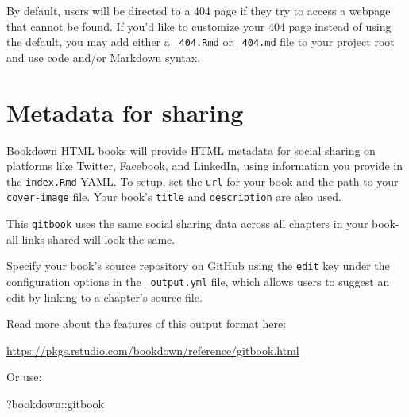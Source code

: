 \documentclass[
]{book}
\newenvironment{Shaded}{\begin{snugshade}}{\end{snugshade}}
\newcommand{\NormalTok}[1]{#1}
\newcommand{\SpecialCharTok}[1]{\textcolor[rgb]{0.00,0.00,0.00}{#1}}
\theoremstyle{definition}
\theoremstyle{definition}
\theoremstyle{definition}
\theoremstyle{definition}
\theoremstyle{remark}
\begin{document}
By default, users will be directed to a 404 page if they try to access a webpage that cannot be found. If you'd like to customize your 404 page instead of using the default, you may add either a \texttt{\_404.Rmd} or \texttt{\_404.md} file to your project root and use code and/or Markdown syntax.

\hypertarget{metadata-for-sharing}{%
\section{Metadata for sharing}\label{metadata-for-sharing}}

Bookdown HTML books will provide HTML metadata for social sharing on platforms like Twitter, Facebook, and LinkedIn, using information you provide in the \texttt{index.Rmd} YAML. To setup, set the \texttt{url} for your book and the path to your \texttt{cover-image} file. Your book's \texttt{title} and \texttt{description} are also used.

This \texttt{gitbook} uses the same social sharing data across all chapters in your book- all links shared will look the same.

Specify your book's source repository on GitHub using the \texttt{edit} key under the configuration options in the \texttt{\_output.yml} file, which allows users to suggest an edit by linking to a chapter's source file.

Read more about the features of this output format here:

\url{https://pkgs.rstudio.com/bookdown/reference/gitbook.html}

Or use:

\begin{Shaded}
\begin{Highlighting}[]
\NormalTok{?bookdown}\SpecialCharTok{::}\NormalTok{gitbook}
\end{Highlighting}
\end{Shaded}


  
\end{document}
